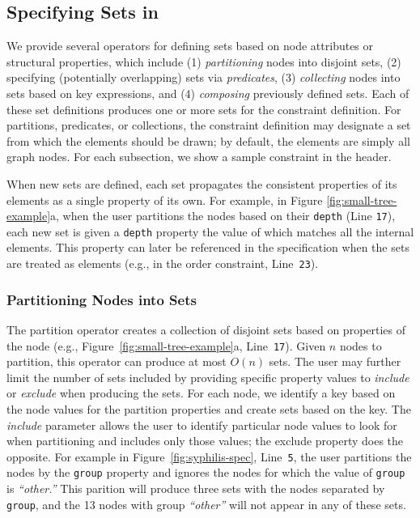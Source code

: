 \smallTreeExampleWebCoLa

\vspace{-5px}
\subsection{Specifying Sets in \projectname}
We provide several operators for defining sets based on node attributes 
or structural properties, which include (1) \emph{partitioning} nodes 
into disjoint sets, (2) specifying (potentially overlapping) sets via
\emph{predicates}, (3) \emph{collecting} nodes into sets based on key expressions,
and (4) \emph{composing} previously defined sets. Each of these set
definitions produces one or more sets for the constraint definition. For
partitions, predicates, or collections, the constraint definition may 
designate a set from which the elements should be drawn; by default, the
elements are simply all graph nodes. For each subsection, we show a sample
\projectname constraint in the header.

When new sets are defined, each set propagates the consistent properties
of its elements as a single property of its own. For example, in
Figure \ref{fig:small-tree-example}a, when the user
partitions the nodes based on their \texttt{depth} (Line
\texttt{17}), each new set is given a \texttt{depth} property the value of which 
matches all the internal elements. This property can later be referenced 
in the \projectname specification when the sets are treated as elements 
(e.g., in the order constraint, Line~\texttt{23}).

\subsubsection{Partitioning Nodes into Sets}
The partition operator creates a collection of disjoint sets based on
properties of the node
(e.g., Figure~\ref{fig:small-tree-example}a, Line~\texttt{17}).
Given $n$ nodes to partition, this operator can produce at most $O(n)$ 
sets. The user may further limit 
the number of sets included by providing specific property values to 
\emph{include} or \emph{exclude} when producing the sets.
For each node, we identify a key based on the node values for the partition
properties and create sets based on the key. The \emph{include} parameter allows
the user to identify particular node values to look for when partitioning
and includes only those values; the exclude property does the opposite. 
For example in Figure~\ref{fig:syphilis-spec}, Line~\texttt{5}, the user
partitions the nodes by the \texttt{group} property and ignores the nodes
for which the value of \texttt{group} is \emph{``other.''} This parition 
will produce three sets with the nodes separated by \texttt{group}, and the 
13 nodes with group \emph{``other''} will not appear in any of these sets.

